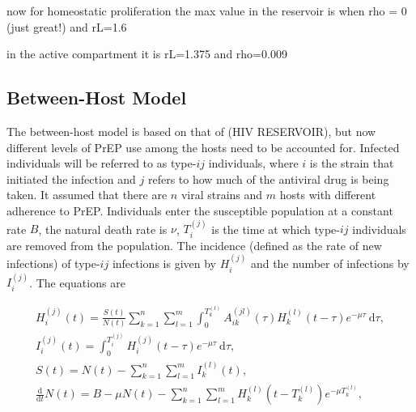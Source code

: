 \documentclass[DIV=15]{scrartcl}
\begin{document}
now for homeostatic proliferation  the max value in the reservoir is when rho = 0 (just great!) and rL=1.6

in the active compartment it  is rL=1.375 and rho=0.009
\fi


\fi





\subsection{Between-Host Model}





The between-host model is based on that of (HIV RESERVOIR), but now different levels of PrEP use  among the hosts need to be accounted for.  Infected individuals will be referred to as type-$ij$ individuals, where $i$ is the strain that initiated the infection and $j$ refers to how much of the antiviral drug is being taken. It assumed that there are $  n$ viral strains and $m$ hosts with different adherence to PrEP. 
 Individuals enter the susceptible population
at a constant rate $B$, the natural death rate is $\nu$, $T_i^{(j)}$ is  the time at which type-$ij$ individuals are removed from the population. The incidence (defined as the rate of new  infections) of  type-$ij$ infections is given by $H_i^{(j)}$ and the number of infections by 
$I_i^{(j)}$. The equations are

\begin{gather}
H^{(j)}_{i}(t) = \frac{S(t)}{N(t)}  \sum_{k=1}^n \sum_{l=1}^m  \int_0^{T^{(l)}_{k}}  A^{(jl)}_{ik}(\tau) H^{(l)}_{k}(t-\tau)e^{-\mu \tau} \ \text{d}\tau,
\label{between host eqns1} \\
I_i^{(j)}(t) = \int_0^{T_i^{(j)}}  H_i^{(j)}(t-\tau)e^{-\mu \tau} \  \text{d}\tau,
\label{between host eqns2} \\
S(t) = N(t) -  \sum_{k=1}^n \sum_{l=1}^m  I^{(l)}_k(t),
\label{between host eqns3} \\
\frac{\text{d}}{\text{d} t}  N(t) = B- \mu N(t) -\sum_{k=1}^n \sum_{l=1}^m  H_k^{(l)}(t-T_k^{(l)})e^{-\mu T_k^{(l)}} ,
\label{between host eqns4}
\end{gather}
\end{document}

